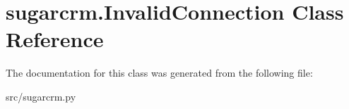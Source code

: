 \hypertarget{classsugarcrm_1_1_invalid_connection}{
\section{sugarcrm.InvalidConnection Class Reference}
\label{classsugarcrm_1_1_invalid_connection}
}


The documentation for this class was generated from the following file:\begin{DoxyCompactItemize}
\item 
src/sugarcrm.py\end{DoxyCompactItemize}
